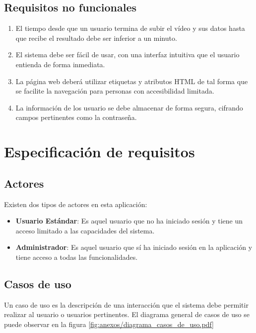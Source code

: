 \subsection{Requisitos no funcionales}

\begin{enumerate}[start=1,label={\bfseries RNF\arabic*:}]
    \item El tiempo desde que un usuario termina de subir el vídeo y sus datos
          hasta que recibe el resultado debe ser inferior a un minuto.
    \item El sistema debe ser fácil de usar, con una interfaz intuitiva que el
          usuario entienda de forma inmediata.
    \item La página web deberá utilizar etiquetas y atributos HTML de tal forma
          que se facilite la navegación para personas con accesibilidad
          limitada.
    \item La información de los usuario se debe almacenar de forma segura,
          cifrando campos pertinentes como la contraseña.
\end{enumerate}

\section{Especificación de requisitos}

\subsection{Actores}

Existen dos tipos de actores en esta aplicación:

\begin{itemize}
    \item \textbf{Usuario Estándar}: Es aquel usuario que no ha iniciado sesión y
          tiene un acceso limitado a las capacidades del sistema.
    \item \textbf{Administrador}: Es aquel usuario que sí ha iniciado sesión en
          la aplicación y tiene acceso a todas las funcionalidades.
\end{itemize}

\subsection{Casos de uso}

Un caso de uso es la descripción de una interacción que el sistema debe permitir
realizar al usuario o usuarios pertinentes. El diagrama general de casos de uso
se puede observar en la figura \ref{fig:anexos/diagrama_casos_de_uso.pdf}

